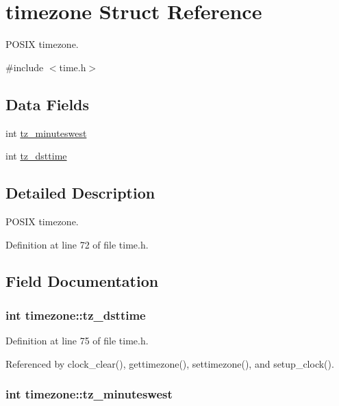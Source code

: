 \hypertarget{structtimezone}{\section{timezone Struct Reference}
\label{structtimezone}
}


P\-O\-S\-I\-X timezone.  




{\ttfamily \#include $<$time.\-h$>$}

\subsection*{Data Fields}
\begin{DoxyCompactItemize}
\item 
int \hyperlink{structtimezone_a3042f7eff6e1b980728def76b1fa0eb7}{tz\-\_\-minuteswest}
\item 
int \hyperlink{structtimezone_a85259977aeb63b17e6ce94f19afdfd99}{tz\-\_\-dsttime}
\end{DoxyCompactItemize}


\subsection{Detailed Description}
P\-O\-S\-I\-X timezone. 

Definition at line 72 of file time.\-h.



\subsection{Field Documentation}
\hypertarget{structtimezone_a85259977aeb63b17e6ce94f19afdfd99}{
\subsubsection[{tz\-\_\-dsttime}]{\setlength{\rightskip}{0pt plus 5cm}int timezone\-::tz\-\_\-dsttime}}\label{structtimezone_a85259977aeb63b17e6ce94f19afdfd99}


Definition at line 75 of file time.\-h.



Referenced by clock\-\_\-clear(), gettimezone(), settimezone(), and setup\-\_\-clock().

\hypertarget{structtimezone_a3042f7eff6e1b980728def76b1fa0eb7}{
\subsubsection[{tz\-\_\-minuteswest}]{\setlength{\rightskip}{0pt plus 5cm}int timezone\-::tz\-\_\-minuteswest}}\label{structtimezone_a3042f7eff6e1b980728def76b1fa0eb7}


